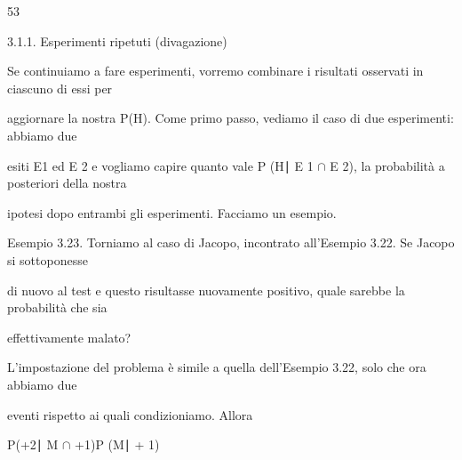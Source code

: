 \documentclass[a4paper,portrait,12pt]{article}
\begin{document}
53





\begin{flushleft}
3.1.1. Esperimenti ripetuti (divagazione)
\end{flushleft}


\begin{flushleft}
Se continuiamo a fare esperimenti, vorremo combinare i risultati osservati in ciascuno di essi per
\end{flushleft}


\begin{flushleft}
aggiornare la nostra P(H). Come primo passo, vediamo il caso di due esperimenti: abbiamo due
\end{flushleft}


\begin{flushleft}
esiti E1 ed E 2 e vogliamo capire quanto vale P (H∣ E 1 $\cap$ E 2), la probabilit\`{a} a posteriori della nostra
\end{flushleft}


\begin{flushleft}
ipotesi dopo entrambi gli esperimenti. Facciamo un esempio.
\end{flushleft}


\begin{flushleft}
Esempio 3.23. Torniamo al caso di Jacopo, incontrato all'Esempio 3.22. Se Jacopo si sottoponesse
\end{flushleft}


\begin{flushleft}
di nuovo al test e questo risultasse nuovamente positivo, quale sarebbe la probabilit\`{a} che sia
\end{flushleft}


\begin{flushleft}
effettivamente malato?
\end{flushleft}


\begin{flushleft}
L'impostazione del problema \`{e} simile a quella dell'Esempio 3.22, solo che ora abbiamo due
\end{flushleft}


\begin{flushleft}
eventi rispetto ai quali condizioniamo. Allora
\end{flushleft}


\begin{flushleft}
P(+2∣ M $\cap$ +1)P (M∣ + 1)
\end{flushleft}
\end{document}
